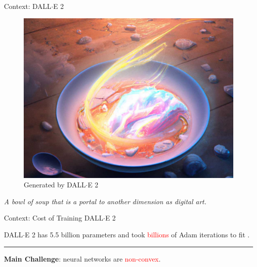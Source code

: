 \documentclass[usenames,dvipsnames,mathserif,notheorems]{beamer}
\newcommand{\horizontalrule}{
	{
			\vspace{-0.5em}
			\center \rule{\textwidth}{0.1em}
			\vspace{-0.2em}
		}
}
\newcommand{\red}[1]{\textcolor{Red}{#1}}
\begin{document}
\begin{frame}{Context: DALL$\cdot$E 2}

	\begin{figure}[]
		\centering
		\includegraphics[width=0.65\linewidth]{assets/bowl_of_soup.jpg}
		\caption*{Generated by DALL$\cdot$E 2}%
	\end{figure}

	\begin{center}
		\textit{\Large A bowl of soup that is a portal to another
			dimension as digital art.}
	\end{center}


\end{frame}

\begin{frame}{Context: Cost of Training DALL$\cdot$E 2}

	\begin{center}
		\Large
		DALL$\cdot$E 2 has 5.5 billion parameters and took \red{billions} of Adam
		iterations to fit \citep{ramesh2022dalle}.
	\end{center}

	\pause
	\horizontalrule

	\begin{center}
		\Large
		\textbf{Main Challenge}: neural networks are \textcolor{red}{non-convex}.
	\end{center}


	\begin{figure}[]
		\centering
		
	\end{figure}

\end{frame}
\end{document}

